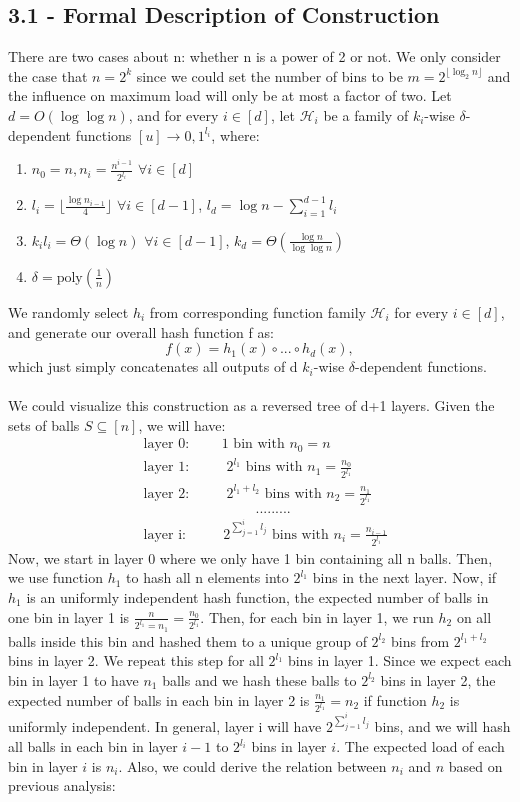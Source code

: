 \documentclass[a4paper, english]{paper}
\begin{document}
	\subsection{3.1 - Formal Description of Construction}
	There are two cases about n: whether n is a power of 2 or not. We only consider the case that $n=2^k$ since we could set the number of bins to be $m = 2^{\lfloor\log_2n\rfloor}$ and the influence on maximum load will only be at most a factor of two. Let $d=O(\log\log n)$, and for every $i\in [d]$, let $\mathscr{H}_i$ be a family of $k_i$-wise $\delta$-dependent functions $[u]\rightarrow{0,1}^{l_i}$, where:
	\begin{enumerate}
		\item $n_0 = n, n_i = \frac{n^{i-1}}{2^{l_i}}$ $\forall i\in [d]$
		\item $l_i = \lfloor\frac{\log n_{i-1}}{4}\rfloor$ $\forall i\in [d-1]$, $l_d = \log n - \sum_{i=1}^{d-1}l_i$
		\item $k_il_i = \Theta(\log n)$ $\forall i\in [d-1]$, $k_d = \Theta(\frac{\log n}{\log\log n})$
		\item $\delta = \text{poly}(\frac1n)$
	\end{enumerate}
	 We randomly select $h_i$ from corresponding function family $\mathscr{H}_i$ for every $i\in [d]$, and generate our overall hash function f as:
	$$f(x) = h_1(x) \circ ... \circ h_d(x),$$
	which just simply concatenates all outputs of d $k_i$-wise $\delta$-dependent functions.\\\\
	We could visualize this construction as a reversed tree of d+1 layers. Given the sets of balls $S\subseteq[n]$, we will have:
	\begin{align*}
	&\text{layer 0:$\qquad$ 1 bin with }n_0 = n\\
	&\text{layer 1:$\qquad$ }2^{l_1}\text{ bins with } n_1 = \frac{n_0}{2^{l_1}}\\
	&\text{layer 2:$\qquad$ }2^{l_1+l_2}\text{ bins with }n_2 = \frac{n_1}{2^{l_1}}\\
	&\qquad\qquad\qquad\qquad.........\\
	&\text{layer i:$\qquad$ }2^{\sum_{j=1}^{i}l_j}\text{ bins with }n_i = \frac{n_{i-1}}{2^{l_i}}
	\end{align*}
	Now, we start in layer 0 where we only have 1 bin containing all n balls. Then, we use function $h_1$ to hash all n elements into $2^{l_1}$ bins in the next layer. Now, if $h_1$ is an uniformly independent hash function, the expected number of balls in one bin in layer 1 is $\frac{n}{2^{l_1}=n_1}=\frac{n_0}{2^{l_1}}$. Then, for each bin in layer 1, we run $h_2$ on all balls inside this bin and hashed them to a unique group of $2^{l_2}$ bins from $2^{l_1+l_2}$ bins in layer 2. We repeat this step for all $2^{l_1}$ bins in layer 1. Since we expect each bin in layer 1 to have $n_1$ balls and we hash these balls to $2^{l_2}$ bins in layer 2, the expected number of balls in each bin in layer 2 is $\frac{n_1}{2^{l_1}}=n_2$ if function $h_2$ is uniformly independent. In general, layer i will have $2^{\sum_{j=1}^{i}l_j}$ bins, and we will hash all balls in each bin in layer $i-1$ to $2^{l_i}$ bins in layer $i$. The expected load of each bin in layer $i$ is $n_i$. Also, we could derive the relation between $n_i$ and $n$ based on previous analysis:
\end{document}
